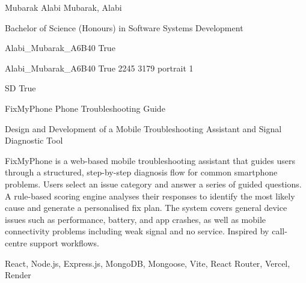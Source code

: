 \documentclass[twoside]{report}
\begin{document}
\begingroup{}\relax



\def\Key{Alabi_Mubarak_A6B40}

{Mubarak Alabi}
{Mubarak, Alabi}

{Bachelor of Science (Honours) in Software Systems Development}

{Alabi_Mubarak_A6B40}
{True}

{Alabi_Mubarak_A6B40}
{True}
{2245}
{3179}
{portrait}
{1}

{SD}
{True}

{FixMyPhone Phone Troubleshooting Guide}

{Design and Development of a Mobile Troubleshooting Assistant and Signal Diagnostic Tool}

{FixMyPhone is a web-based mobile troubleshooting assistant that guides users through a structured, step-by-step diagnosis flow for common smartphone problems. Users select an issue category and answer a series of guided questions. A rule-based scoring engine analyses their responses to identify the most likely cause and generate a personalised fix plan. The system covers general device issues such as performance, battery, and app crashes, as well as mobile connectivity problems including weak signal and no service. Inspired by call-centre support workflows.}

{React, Node.js, Express.js, MongoDB, Mongoose, Vite, React Router, Vercel, Render}
\end{document}
